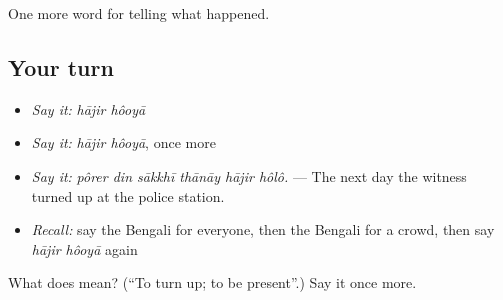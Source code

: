 \begin{grammarlens}[title={What you've built}]
One more word for telling what happened.
\end{grammarlens}

\subsection*{Your turn}
\begin{itemize}
\raggedright
  \item \emph{Say it:} \emph{hājir hôoyā}
  \item \emph{Say it:} \emph{hājir hôoyā}, once more
  \item \emph{Say it:} \emph{pôrer din sākkhī thānāy hājir hôlô.} — The next day the witness turned up at the police station.
  \item \emph{Recall:} say the Bengali for everyone, then the Bengali for a crowd, then say \emph{hājir hôoyā} again
\end{itemize}

\begin{tcolorbox}[breakable,colback=teal!4,colframe=teal!35!black,title={Before you move on}]
What does   mean? (\textquotedblleft{}To turn up; to be present\textquotedblright{}.) Say it once more.
\end{tcolorbox}
